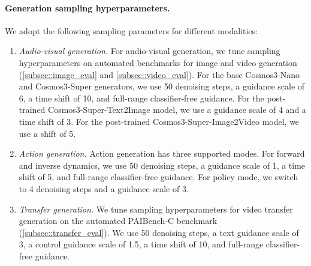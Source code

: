 \paragraph{Generation sampling hyperparameters.} We adopt the following sampling parameters for different modalities:
\begin{enumerate}
    \item \textit{Audio-visual generation.} For audio-visual generation, we tune sampling hyperparameters on automated benchmarks for image and video generation (\cref{subsec::image_eval} and \cref{subsec::video_eval}). For the base Cosmos3-Nano and Cosmos3-Super generators, we use 50 denoising steps, a guidance scale of 6, a time shift of 10, and full-range classifier-free guidance. For the post-trained Cosmos3-Super-Text2Image model, we use a guidance scale of 4 and a time shift of 3. For the post-trained Cosmos3-Super-Image2Video model, we use a shift of 5.
    \item \textit{Action generation.} Action generation has three supported modes. For forward and inverse dynamics, we use 50 denoising steps, a guidance scale of 1, a time shift of 5, and full-range classifier-free guidance. For policy mode, we switch to 4 denoising steps and a guidance scale of 3.
    \item \textit{Transfer generation.} We tune sampling hyperparameters for video transfer generation on the automated PAIBench-C benchmark (\cref{subsec::transfer_eval}). We use 50 denoising steps, a text guidance scale of 3, a control guidance scale of 1.5, a time shift of 10, and full-range classifier-free guidance.
\end{enumerate}
